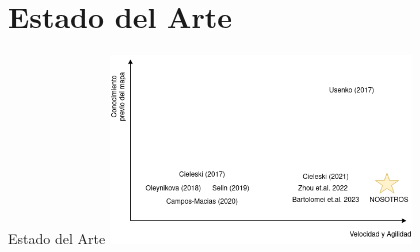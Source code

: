 \documentclass[
  24pt, %
  aspectratio=169, %
]{beamer}
\begin{document}
\section{Estado del Arte}
\begin{frame}{Estado del Arte}
  \bigskip %
  \centering
  \includegraphics[width=0.6\textwidth]{soa}
\end{frame}
\end{document}
